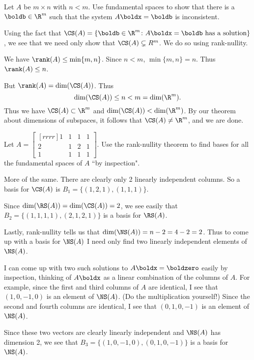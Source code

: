 \ii Let $A$ be $m\times n$ with $n<m$. Use fundamental spaces to show that there is a $\boldb\in\R^m$ such that the system $A\boldx=\boldb$ is inconsistent. 
\\
\begin{solution}
Using the fact that $\CS(A)=\{\boldb\in\R^m\colon A\boldx=\boldb \text{ has a solution}\}$, we see that we need only show that $\CS(A)\subsetneq R^m$. We do so using rank-nullity. 

We have $\rank(A)\leq\min\{m,n\}$. Since $n<m$, $\min\{m,n\}=n$. Thus $\rank(A)\leq n$. 

But $\rank(A)=\dim(\CS(A))$. Thus 
\[\dim(\CS(A))\leq n<m=\dim(\R^m).\] 
Thus we have $\CS(A)\subset \R^m$ and $\dim(\CS(A))<\dim(\R^m)$. 
By our theorem about dimensions of subspaces, it follows that $\CS(A)\ne \R^m$, and we are done. 

\end{solution}
\ii Let $A=\begin{bmatrix}[rrrr]1&1&1&1\\ 2&1&2&1\\ 1&1&1&1 \end{bmatrix}$. 
Use the rank-nullity theorem to find bases for all the fundamental spaces of $A$ ``by inspection". 
\\
\begin{solution}
More of the same. There are clearly only 2 linearly independent columns. So a basis for $\CS(A)$ is $B_1=\{(1,2,1),(1,1,1)\}$. 

Since $\dim(\RS(A))=\dim(\CS(A))=2$, we see easily that $B_2=\{(1,1,1,1),(2,1,2,1)\}$ is a basis for $\RS(A)$. 

Lastly, rank-nullity tells us that $\dim(\NS(A))=n-2=4-2=2$. Thus to come up with a basis for $\NS(A)$ I need only find two linearly independent elements of $\NS(A)$. 

I can come up with two such solutions to $A\boldx=\boldzero$ easily by inspection, thinking of $A\boldx$ as a linear combination of the columns of $A$. For example, since the first and third columns of $A$ are identical, I see that $(1,0,-1,0)$ is an element of $\NS(A)$. (Do the multiplication yourself!) Since the second and fourth columns are identical, I see that $(0,1,0,-1)$ is an element of $\NS(A)$. 

Since these two vectors are clearly linearly independent and $\NS(A)$ has dimension 2, we see that $B_3=\{(1,0,-1,0), (0,1,0,-1)\}$ is a basis for $\NS(A)$.    
\end{solution}
